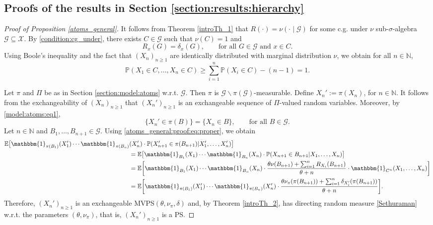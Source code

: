 \documentclass[a4paper]{article}
\theoremstyle{plain}
\theoremstyle{remark}
\theoremstyle{definition}
\begin{document}
\subsection{Proofs of the results in Section \ref{section:results:hierarchy}}

\begin{proof}[Proof of Proposition \ref{atoms_general}]
It follows from Theorem \ref{introTh_1} that $R(\cdot)=\nu(\cdot\mid\mathcal{G})$ for some c.g. under $\nu$ sub-$\sigma$-algebra $\mathcal{G}\subseteq\mathcal{X}$. By \eqref{condition:cg_under}, there exists $C\in\mathcal{G}$ such that $\nu(C)=1$ and
\begin{equation}\label{atoms_general:proof:eq:proper}
R_x(G)=\delta_x(G),\qquad\mbox{for all }G\in\mathcal{G}\mbox{ and }x\in C.
\end{equation}
Using Boole's inequality and the fact that $(X_n)_{n\geq1}$ are identically distributed with marginal distribution $\nu$, we obtain for all $n\in\mathbb{N}$,
\[\mathbb{P}(X_1\in C,\ldots,X_n\in C)\geq\sum_{i=1}^n\mathbb{P}(X_i\in C)-(n-1)=1.\]

Let $\pi$ and $\Pi$ be as in Section \ref{section:model:atoms} w.r.t. $\mathcal{G}$. Then $\pi$ is $\mathcal{G}\backslash\pi(\mathcal{G})$-measurable. Define $X_n':=\pi(X_n)$, for $n\in\mathbb{N}$. It follows from the exchangeability of $(X_n)_{n\geq1}$ that $(X_n')_{n\geq1}$ is an exchangeable sequence of $\Pi$-valued random variables. Moreover, by \eqref{model:atoms:eq1},
\[\{X_n'\in\pi(B)\}=\{X_n\in B\},\qquad\mbox{for all }B\in\mathcal{G}.\]
Let $n\in\mathbb{N}$ and $B_1,\ldots,B_{n+1}\in\mathcal{G}$. Using \eqref{atoms_general:proof:eq:proper}, we obtain
\begingroup\allowdisplaybreaks
\begin{align*}
\mathbb{E}\bigl[\mathbbm{1}_{\pi(B_1)}(X_1')\cdots\mathbbm{1}_{\pi(B_n)}&(X_n')\cdot\mathbb{P}(X_{n+1}'\in\pi(B_{n+1})|X_1',\ldots,X_n')\bigr]\\
&=\mathbb{E}\bigl[\mathbbm{1}_{B_1}(X_1)\cdots\mathbbm{1}_{B_n}(X_n)\cdot\mathbb{P}(X_{n+1}\in B_{n+1}|X_1,\ldots,X_n)\bigr]\\
&=\mathbb{E}\biggl[\mathbbm{1}_{B_1}(X_1)\cdots\mathbbm{1}_{B_n}(X_n)\cdot\frac{\theta\nu(B_{n+1})+\sum_{i=1}^nR_{X_i}(B_{n+1})}{\theta+n}\cdot\mathbbm{1}_{C^n}(X_1,\ldots,X_n)\biggr]\\
&=\mathbb{E}\biggl[\mathbbm{1}_{\pi(B_1)}(X_1')\cdots\mathbbm{1}_{\pi(B_n)}(X_n')\cdot\frac{\theta\nu_\pi(\pi(B_{n+1}))+\sum_{i=1}^n\delta_{X_i'}(\pi(B_{n+1}))}{\theta+n}\biggr].
\end{align*}
\endgroup
Therefore, $(X_n')_{n\geq1}$ is an exchangeable MVPS$(\theta,\nu_\pi,\delta)$ and, by Theorem \ref{introTh_2}, has directing random measure \eqref{Sethuraman} w.r.t. the parameters $(\theta,\nu_\pi)$, that is, $(X_n')_{n\geq1}$ is a PS.
\end{proof}
\end{document}
